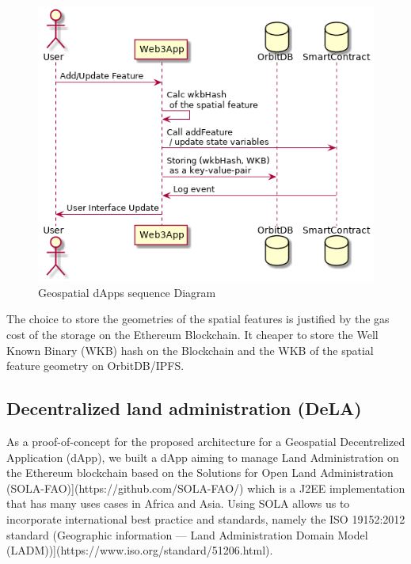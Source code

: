 \documentclass{isprs} %
\begin{document}
\begin{figure}[ht!]
\begin{center}
		\includegraphics[width=1.0\columnwidth]{figures/seq-geospatial-dapps.png}
	\caption{Geospatial dApps sequence Diagram}
\label{fig:figure_placement}
\end{center}
\end{figure}

The choice to store the geometries of the spatial features is justified by the gas cost of the storage on the Ethereum Blockchain. It cheaper to store the Well Known Binary (WKB) hash on the Blockchain and the WKB of the spatial feature geometry on OrbitDB/IPFS.

\subsection{Decentralized land administration (DeLA)}\label{sec:Decentralized land administration (DeLA)}

As a proof-of-concept for the proposed architecture for a Geospatial Decentrelized Application (dApp), we built a dApp aiming to manage Land Administration on the Ethereum blockchain based on the Solutions for Open Land Administration (SOLA-FAO)](https://github.com/SOLA-FAO/) which is a J2EE implementation that has many uses cases in Africa and Asia. Using SOLA allows us to incorporate international best practice and standards, namely the ISO 19152:2012 standard (Geographic information — Land Administration Domain Model (LADM))](https://www.iso.org/standard/51206.html).
\end{document}
